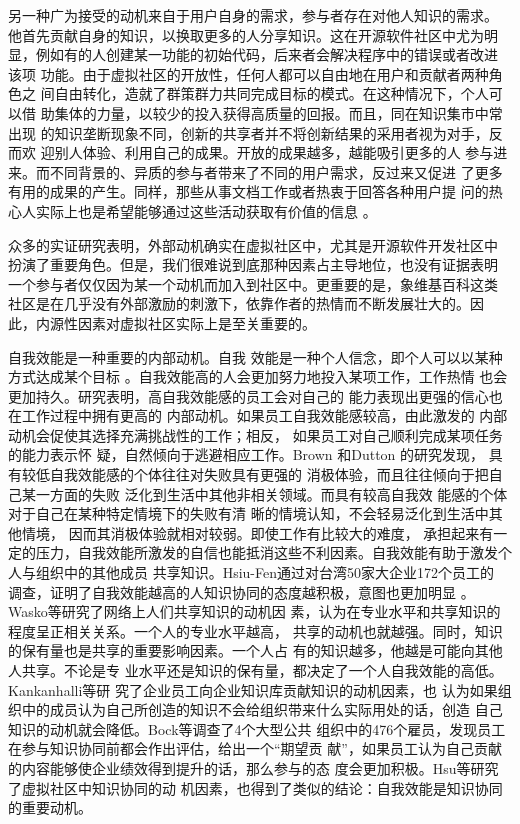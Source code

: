 另一种广为接受的动机来自于用户自身的需求，参与者存在对他人知识的需求。
他首先贡献自身的知识，以换取更多的人分享知识。这在开源软件社区中尤为明
显，例如有的人创建某一功能的初始代码，后来者会解决程序中的错误或者改进
该项
功能。由于虚拟社区的开放性，任何人都可以自由地在用户和贡献者两种角色之
间自由转化，造就了群策群力共同完成目标的模式。在这种情况下，个人可以借
助集体的力量，以较少的投入获得高质量的回报。而且，同在知识集市中常出现
的知识垄断现象不同，创新的共享者并不将创新结果的采用者视为对手，反而欢
迎别人体验、利用自己的成果。开放的成果越多，越能吸引更多的人
参与进来。而不同背景的、异质的参与者带来了不同的用户需求，反过来又促进
了更多有用的成果的产生。同样，那些从事文档工作或者热衷于回答各种用户提
问的热心人实际上也是希望能够通过这些活动获取有价值的信息
\cite{lakhani2003fos}。



众多的实证研究表明，外部动机确实在虚拟社区中，尤其是开源软件开发社区中
扮演了重要角色。但是，我们很难说到底那种因素占主导地位，也没有证据表明
一个参与者仅仅因为某一个动机而加入到社区中。更重要的是，象维基百科这类
社区是在几乎没有外部激励的刺激下，依靠作者的热情而不断发展壮大的。因
此，内源性因素对虚拟社区实际上是至关重要的。

自我效能是一种重要的内部动机。自我
效能是一种个人信念，即个人可以以某种方式达成某个目标
\cite{ormrod2003epd}。自我效能高的人会更加努力地投入某项工作，工作热情
也会更加持久\cite{schunk1990gsa}。研究表明，高自我效能感的员工会对自己的
能力表现出更强的信心也在工作过程中拥有更高的
内部动机。如果员工自我效能感较高，由此激发的
内部动机会促使其选择充满挑战性的工作；相反，
如果员工对自己顺利完成某项任务的能力表示怀
疑，自然倾向于逃避相应工作\cite{David2007,bandura2003nse}。Brown 和Dutton 的研究发现，
具有较低自我效能感的个体往往对失败具有更强的
消极体验，而且往往倾向于把自己某一方面的失败
泛化到生活中其他非相关领域。而具有较高自我效
能感的个体对于自己在某种特定情境下的失败有清
晰的情境认知，不会轻易泛化到生活中其他情境，
因而其消极体验就相对较弱\cite{brown1995tvc}。即使工作有比较大的难度，
承担起来有一定的压力，自我效能所激发的自信也能抵消这些不利因素。自我效能有助于激发个人与组织中的其他成员
共享知识。Hsiu-Fen通过对台湾50家大企业172个员工的
调查，证明了自我效能越高的人知识协同的态度越积极，意图也更加明显
\cite{Hsiu-FenLin04012007}。Wasko等研究了网络上人们共享知识的动机因
素，认为在专业水平和共享知识的程度呈正相关关系。一个人的专业水平越高，
共享的动机也就越强。同时，知识的保有量也是共享的重要影响因素。一个人占
有的知识越多，他越是可能向其他人共享\cite{1631335820050301}。不论是专
业水平还是知识的保有量，都决定了一个人自我效能的高低。Kankanhalli等研
究了企业员工向企业知识库贡献知识的动机因素，也
认为如果组织中的成员认为自己所创造的知识不会给组织带来什么实际用处的话，创造
自己知识的动机就会降低\cite{1631337020050301}。Bock等调查了4个大型公共
组织中的476个雇员，发现员工在参与知识协同前都会作出评估，给出一个“期望贡
献”，如果员工认为自己贡献的内容能够使企业绩效得到提升的话，那么参与的态
度会更加积极\cite{631757820020401}。Hsu等研究了虚拟社区中知识协同的动
机因素，也得到了类似的结论：自我效能是知识协同的重要动机\cite{Hsu2007}。


